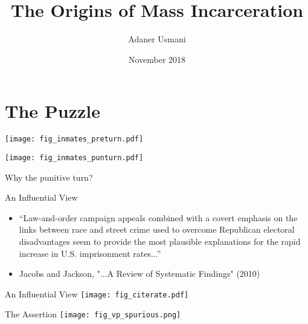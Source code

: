 \documentclass{beamer}
\title{The Origins of Mass Incarceration}
\author{Adaner Usmani}
\institute[Brown]
{
 Postdoctoral Fellow \\
 Watson Institute \\
 Brown University
}
\date{November 2018}
\begin{document}
\begin{frame}
  \titlepage
\end{frame}


\section{The Puzzle}

\begin{frame}{}
\begin{center}
    \texttt{[image: fig\_inmates\_preturn.pdf]}
\end{center}
\end{frame}

\begin{frame}{}
\begin{center}
   \texttt{[image: fig\_inmates\_punturn.pdf]} 
\end{center}
\end{frame}

\begin{frame}{}
\begin{center}
    {\Large Why the punitive turn?}
\end{center}
\end{frame}

\begin{frame}{An Influential View}
\begin{itemize}
\item[] ``Law-and-order campaign appeals combined with a covert emphasis on the links between race and street crime used to overcome Republican electoral disadvantages seem to provide \alert{the most plausible explanations} for the rapid increase in U.S. imprisonment rates...''
\item[] {\footnotesize Jacobs and Jackson, "...A Review of Systematic Findings" (2010)}
\end{itemize}
\end{frame}

\begin{frame}{An Influential View}
\texttt{[image: fig\_citerate.pdf]}
\end{frame}

\begin{frame}{The Assertion}
\texttt{[image: fig\_vp\_spurious.png]}
\end{frame}
\end{document}
